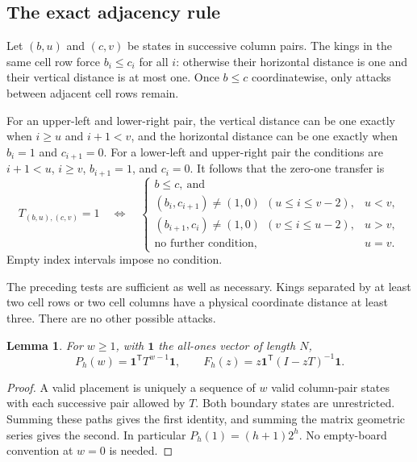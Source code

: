\documentclass[11pt,letterpaper]{article}
\numberwithin{equation}{section}
\newtheorem{lemma}[theorem]{Lemma}
\theoremstyle{remark}\newtheorem{remark}[theorem]{Remark}
\newcommand{\one}{\mathbf 1}
\begin{document}
\subsection{The exact adjacency rule}
Let $(b,u)$ and $(c,v)$ be states in successive column pairs. The kings in the same cell row force $b_i\le c_i$ for all $i$: otherwise their horizontal distance is one and their vertical distance is at most one. Once $b\le c$ coordinatewise, only attacks between adjacent cell rows remain.

For an upper-left and lower-right pair, the vertical distance can be one exactly when $i\ge u$ and $i+1<v$, and the horizontal distance can be one exactly when $b_i=1$ and $c_{i+1}=0$. For a lower-left and upper-right pair the conditions are $i+1<u$, $i\ge v$, $b_{i+1}=1$, and $c_i=0$. It follows that the zero-one transfer is
\begin{equation}\label{mdk:pl:eq:transfer}
 T_{(b,u),(c,v)}=1
 \quad\Longleftrightarrow\quad
 \begin{cases}
 b\le c,\ \text{and}\\
 (b_i,c_{i+1})\ne (1,0)\ \ (u\le i\le v-2),&u<v,\\
 (b_{i+1},c_i)\ne (1,0)\ \ (v\le i\le u-2),&u>v,\\
 \text{no further condition},&u=v.
 \end{cases}
\end{equation}
Empty index intervals impose no condition.

The preceding tests are sufficient as well as necessary. Kings separated by at least two cell rows or two cell columns have a physical coordinate distance at least three. There are no other possible attacks.

\begin{lemma}\label{mdk:pl:lem:count}
For $w\ge1$, with $\one$ the all-ones vector of length $N$,
\begin{equation}\label{mdk:pl:eq:count}
 P_h(w)=\one^{\mathsf T}T^{w-1}\one,
 \qquad
 F_h(z)=z\one^{\mathsf T}(I-zT)^{-1}\one.
\end{equation}
\end{lemma}
\begin{proof}
A valid placement is uniquely a sequence of $w$ valid column-pair states with each successive pair allowed by $T$. Both boundary states are unrestricted. Summing these paths gives the first identity, and summing the matrix geometric series gives the second. In particular $P_h(1)=(h+1)2^h$. No empty-board convention at $w=0$ is needed.
\end{proof}
\end{document}
